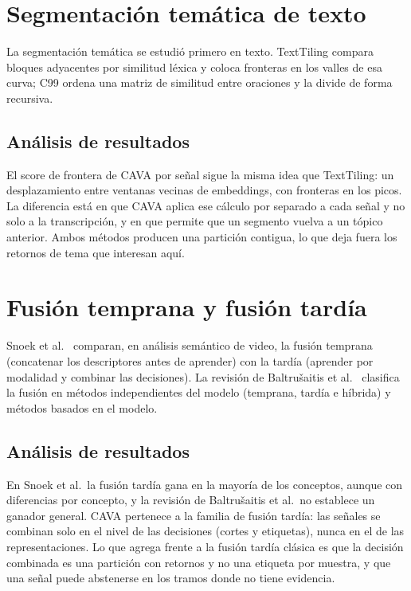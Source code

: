 \section{Segmentación temática de texto}

La segmentación temática se estudió primero en texto. TextTiling \cite{hearst1997texttiling}
compara bloques adyacentes por similitud léxica y coloca fronteras en los valles de esa
curva; C99 \cite{choi2000advances} ordena una matriz de similitud entre oraciones y la divide
de forma recursiva.

\subsection{Análisis de resultados}
El score de frontera de CAVA por señal sigue la misma idea que TextTiling: un desplazamiento
entre ventanas vecinas de embeddings, con fronteras en los picos. La diferencia está en que
CAVA aplica ese cálculo por separado a cada señal y no solo a la transcripción, y en que
permite que un segmento vuelva a un tópico anterior. Ambos métodos producen una partición
contigua, lo que deja fuera los retornos de tema que interesan aquí.

\section{Fusión temprana y fusión tardía}

Snoek et al.\ \cite{snoek2005early} comparan, en análisis semántico de video, la fusión
temprana (concatenar los descriptores antes de aprender) con la tardía (aprender por
modalidad y combinar las decisiones). La revisión de Baltrušaitis et al.\
\cite{baltrusaitis2019multimodal} clasifica la fusión en métodos independientes del modelo
(temprana, tardía e híbrida) y métodos basados en el modelo.

\subsection{Análisis de resultados}
En Snoek et al.\ la fusión tardía gana en la mayoría de los conceptos, aunque con
diferencias por concepto, y la revisión de Baltrušaitis et al.\ no establece un ganador
general. CAVA pertenece a la familia de fusión tardía: las señales se combinan solo en el
nivel de las decisiones (cortes y etiquetas), nunca en el de las representaciones. Lo que
agrega frente a la fusión tardía clásica es que la decisión combinada es una partición con
retornos y no una etiqueta por muestra, y que una señal puede abstenerse en los tramos donde
no tiene evidencia.

